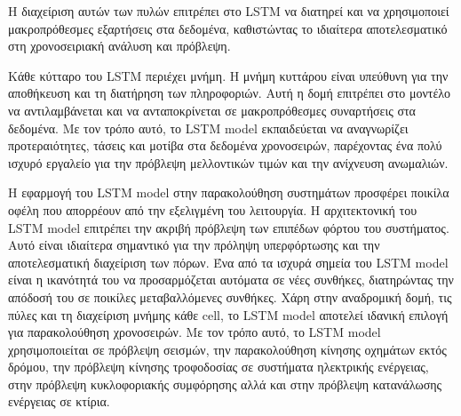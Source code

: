 Η διαχείριση αυτών των πυλών επιτρέπει στο LSTM να διατηρεί και να χρησιμοποιεί μακροπρόθεσμες εξαρτήσεις στα δεδομένα, καθιστώντας το ιδιαίτερα αποτελεσματικό στη χρονοσειριακή ανάλυση και πρόβλεψη.

Κάθε κύτταρο του LSTM περιέχει μνήμη. Η μνήμη κυττάρου είναι υπεύθυνη για την αποθήκευση και τη διατήρηση των πληροφοριών. Αυτή η δομή επιτρέπει στο μοντέλο να αντιλαμβάνεται και να ανταποκρίνεται σε μακροπρόθεσμες συναρτήσεις στα δεδομένα. Με τον τρόπο αυτό, το LSTM model εκπαιδεύεται να αναγνωρίζει προτεραιότητες, τάσεις και μοτίβα στα δεδομένα χρονοσειρών, παρέχοντας ένα πολύ ισχυρό εργαλείο για την πρόβλεψη μελλοντικών τιμών και την ανίχνευση ανωμαλιών.

Η εφαρμογή του LSTM model στην παρακολούθηση συστημάτων προσφέρει ποικίλα οφέλη που απορρέουν από την εξελιγμένη του λειτουργία. Η αρχιτεκτονική του LSTM model επιτρέπει την ακριβή πρόβλεψη των επιπέδων φόρτου του συστήματος. Αυτό είναι ιδιαίτερα σημαντικό για την πρόληψη υπερφόρτωσης και την αποτελεσματική διαχείριση των πόρων. Ένα από τα ισχυρά σημεία του LSTM model είναι η ικανότητά του να προσαρμόζεται αυτόματα σε νέες συνθήκες, διατηρώντας την απόδοσή του σε ποικίλες μεταβαλλόμενες συνθήκες.
Χάρη στην αναδρομική δομή, τις πύλες και τη διαχείριση μνήμης κάθε cell, το LSTM model αποτελεί ιδανική επιλογή για παρακολούθηση χρονοσειρών. Με τον τρόπο αυτό, το LSTM model χρησιμοποιείται σε πρόβλεψη σεισμών, την παρακολούθηση κίνησης οχημάτων εκτός δρόμου, την πρόβλεψη κίνησης τροφοδοσίας σε συστήματα ηλεκτρικής ενέργειας, στην πρόβλεψη κυκλοφοριακής συμφόρησης αλλά και στην πρόβλεψη κατανάλωσης ενέργειας σε κτίρια.
